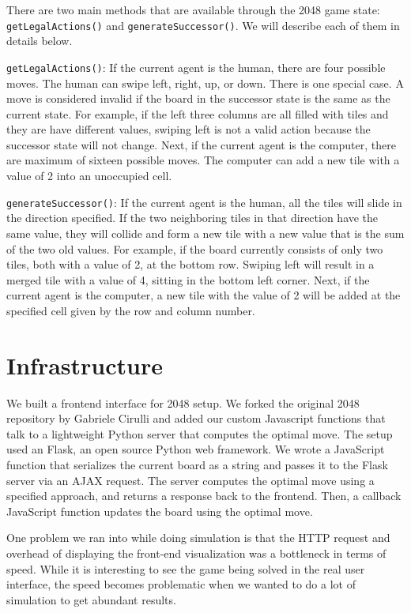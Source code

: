 \documentclass[11pt,twocolumn]{article}
\begin{document}
There are two main methods that are available through the 2048 game state: \texttt{getLegalActions()} and \texttt{generateSuccessor()}. We will describe each of them in details below.

\texttt{getLegalActions()}: If the current agent is the human, there are four possible moves. The human can swipe left, right, up, or down. There is one special case. A move is considered invalid if the board in the successor state is the same as the current state. For example, if the left three columns are all filled with tiles and they are have different values, swiping left is not a valid action because the successor state will not change. Next, if the current agent is the computer, there are maximum of sixteen possible moves. The computer can add a new tile with a value of 2 into an unoccupied cell.

\texttt{generateSuccessor()}: If the current agent is the human, all the tiles will slide in the direction specified. If the two neighboring tiles in that direction have the same value, they will collide and form a new tile with a new value that is the sum of the two old values. For example, if the board currently consists of only two tiles, both with a value of 2, at the bottom row. Swiping left will result in a merged tile with a value of 4, sitting in the bottom left corner. Next, if the current agent is the computer, a new tile with the value of 2 will be added at the specified cell given by the row and column number.

\section{Infrastructure}

We built a frontend interface for 2048 setup. We forked the original 2048 repository by Gabriele Cirulli and added our custom Javascript functions that talk to a lightweight Python server that computes the optimal move. The setup used an Flask, an open source Python web framework. We wrote a JavaScript function that serializes the current board as a string and passes it to the Flask server via an AJAX request. The server computes the optimal move using a specified approach, and returns a response back to the frontend. Then, a callback JavaScript function updates the board using the optimal move. 

One problem we ran into while doing simulation is that the HTTP request and overhead of displaying the front-end visualization was a bottleneck in terms of speed. While it is interesting to see the game being solved in the real user interface, the speed becomes problematic when we wanted to do a lot of simulation to get abundant results.
\end{document}
